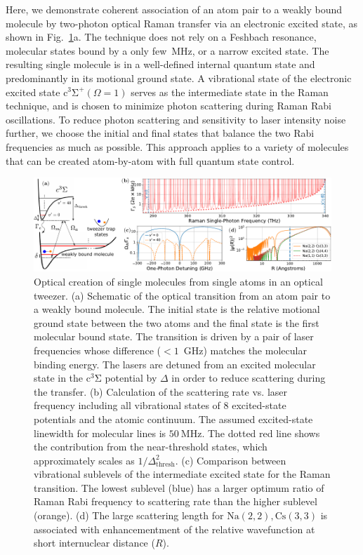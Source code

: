 \documentclass[aps,prl,twocolumn,10pt,superscriptaddress]{revtex4-1}
\newcommand{\Na}{\mathrm{Na}}
\newcommand{\Cs}{\mathrm{Cs}}
\begin{document}
Here, we demonstrate coherent association of an atom pair to a weakly bound molecule
by two-photon optical Raman transfer via an electronic excited state,
as shown in Fig.~\ref{f-theory}a.
The technique does not rely on a Feshbach resonance,
molecular states bound by a only few~MHz, or a narrow excited state.
The resulting single molecule is in a well-defined internal quantum state
and predominantly in its motional ground state.
A vibrational state of the electronic excited state $\mathrm{c^3\Sigma^+}(\Omega = 1)$
serves as the intermediate state in the Raman technique,
and is chosen to minimize photon scattering during Raman Rabi oscillations.
To reduce photon scattering and sensitivity to laser intensity noise further,
we choose the initial and final states that balance the two Rabi frequencies as much as possible.
This approach applies to a variety of molecules that can be created atom-by-atom with full quantum state control.


\begin{figure}
  \includegraphics[width=\textwidth]{imgs/fig-theory.pdf}
  \caption{Optical creation of single molecules from single atoms in an optical tweezer.
    (a) Schematic of the optical transition from an atom pair to a weakly bound molecule.
    The initial state is the relative motional ground state between the two atoms
    and the final state is the first molecular bound state.
    The transition is driven by a pair of laser frequencies whose difference ($< 1$~GHz) matches the molecular binding energy.
    The lasers are detuned from an excited molecular state in the $\mathrm{c^3\Sigma}$ potential
    by $\Delta$ in order to reduce scattering during the transfer.
    (b) Calculation of the scattering rate vs. laser frequency
    including all vibrational states of 8 excited-state potentials
    and the atomic continuum.
    The assumed excited-state linewidth for molecular lines is $50~\text{MHz}$.
    The dotted red line shows the contribution from the near-threshold states, which approximately scales as $1/\Delta_{\mathrm{thresh}}^2$.
    (c) Comparison between vibrational sublevels of the intermediate excited state
    for the Raman transition.
    The lowest sublevel (blue)
    has a larger optimum ratio of Raman Rabi frequency to scattering rate
    than the higher sublevel (orange).
    (d) The large scattering length for $\Na(2,2),\Cs(3,3)$ is associated with enhancementment of the relative wavefunction at short
    internuclear distance ($R$).
    \label{f-theory}
  }
\end{figure}
\end{document}
